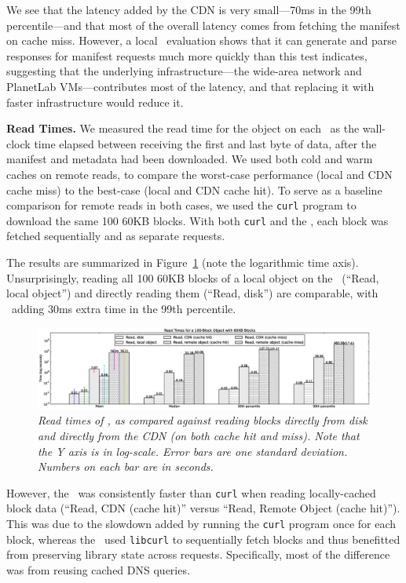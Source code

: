 We see that the latency added by the CDN
is very small---70ms in the 99th percentile---and that most of
the overall latency comes from fetching the manifest on cache miss.  However, a
local \SG\ evaluation shows that it can generate and parse responses
for manifest requests much more quickly than this test indicates, suggesting that the underlying 
infrastructure---the wide-area network and PlanetLab VMs---contributes most of the 
latency, and that replacing it with faster infrastructure would reduce it.

{\bf Read Times.} We measured the read time for the
object on each \SG\ as the wall-clock time elapsed
between receiving the first and last byte of data, after the manifest and 
metadata had been downloaded.  We used both cold and warm caches on remote 
reads, to compare the worst-case performance (local and CDN cache miss) to the best-case
(local and CDN cache hit).  To serve as a baseline comparison for remote reads in both cases,
we used the {\tt curl} program to download the same 100 60KB blocks.  
With both {\tt curl} and the \SG, each block was fetched sequentially and as separate requests.

The results are summarized in Figure~\ref{fig:read_performance} (note the logarithmic time 
axis).  Unsurprisingly, reading all 100 60KB blocks of a local object on the
\SG\ (``Read, local object'') and directly reading them (``Read, disk'')
are comparable, with \Syndicate\
adding 30ms extra time in the 99th percentile.

\begin{figure}
\centerline{\includegraphics[width=1.2\textwidth]{figures/read_performance}}
\caption{\it
Read times of \Syndicate, as compared against reading blocks directly from disk and directly from the CDN (on both cache hit and miss).  Note that the Y axis is in log-scale.  Error bars are one standard deviation.  Numbers on each bar are in seconds.}
\label{fig:read_performance}
\end{figure}

However, the \SG\ was consistently faster than {\tt curl} when reading locally-cached block data
(``Read, CDN (cache hit)'' versus ``Read, Remote Object (cache hit)'').  This was 
due to the slowdown added by running the {\tt curl} program once for each block, whereas
the \SG\ used {\tt libcurl} to sequentially fetch blocks and thus benefitted from
preserving library state across requests.  Specifically, most of the
difference was from reusing cached DNS queries.

